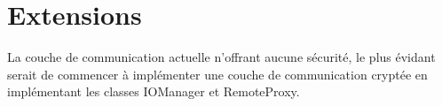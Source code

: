 \chapter{Extensions}

La couche de communication actuelle n'offrant aucune sécurité, le plus évidant serait de commencer à implémenter une couche de communication cryptée en implémentant les classes IOManager et RemoteProxy.

